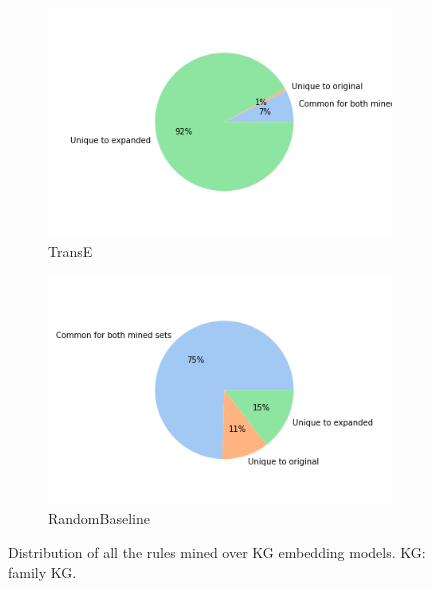 \begin{figure}[h]
\begin{subfigure}[b]{0.49\textwidth}
            \centering 
            \includegraphics[width=\textwidth]{figures/results/pie_charts-model/transE_family.png}
            \caption[]%
            {{\small TransE}}    
            \label{fig:trasE_pie}
        \end{subfigure}
        \hfill
        \begin{subfigure}[b]{0.49\textwidth}   
            \centering 
            \includegraphics[width=\textwidth]{figures/results/pie_charts-model/randomBaseline_family.png}
            \caption[]%
            {{\small RandomBaseline}}    
            \label{fig:randomBaseline_pie}
        \end{subfigure}
        \caption[ The average and standard deviation of critical parameters ]
        {\small Distribution of all the rules mined over KG embedding models. KG: family KG.} 
        \label{fig:mean and std of nets}
    \end{figure}
    
